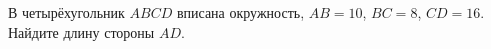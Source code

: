 \begin{ex}
	\begin{condition}
		В четырёхугольник \( ABCD  \) вписана окружность, \( AB=10 \), \( BC=8 \), \( CD=16 \). Найдите длину стороны \( AD \).
	\end{condition}
\end{ex}